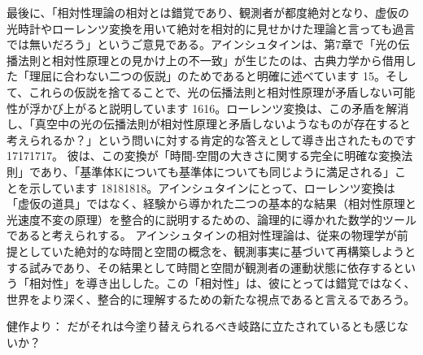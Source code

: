 \documentclass{article}
\begin{document}
最後に、「相対性理論の相対とは錯覚であり、観測者が都度絶対となり、虚仮の光時計やローレンツ変換を用いて絶対を相対的に見せかけた理論と言っても過言では無いだろう」というご意見である。アインシュタインは、第7章で「光の伝播法則と相対性原理との見かけ上の不一致」が生じたのは、古典力学から借用した「理屈に合わない二つの仮説」のためであると明確に述べています 15。そして、これらの仮説を捨てることで、光の伝播法則と相対性原理が矛盾しない可能性が浮かび上がると説明しています 1616。ローレンツ変換は、この矛盾を解消し、「真空中の光の伝播法則が相対性原理と矛盾しないようなものが存在すると考えられるか？」という問いに対する肯定的な答えとして導き出されたものです 17171717。
彼は、この変換が「時間-空間の大きさに関する完全に明確な変換法則」であり、「基準体Kについても基準体についても同じように満足される」ことを示しています 18181818。アインシュタインにとって、ローレンツ変換は「虚仮の道具」ではなく、経験から導かれた二つの基本的な結果（相対性原理と光速度不変の原理）を整合的に説明するための、論理的に導かれた数学的ツールであると考えられする。
アインシュタインの相対性理論は、従来の物理学が前提としていた絶対的な時間と空間の概念を、観測事実に基づいて再構築しようとする試みであり、その結果として時間と空間が観測者の運動状態に依存するという「相対性」を導き出しした。この「相対性」は、彼にとっては錯覚ではなく、世界をより深く、整合的に理解するための新たな視点であると言えるであろう。

健作より：
だがそれは今塗り替えられるべき岐路に立たされているとも感じないか？
\end{document}
